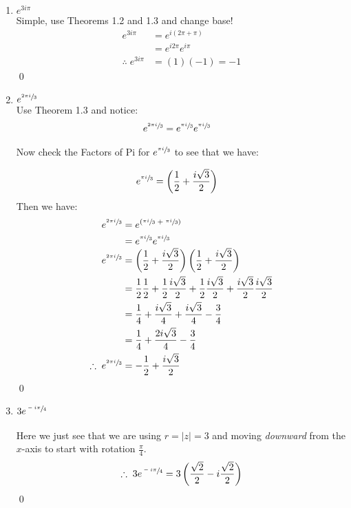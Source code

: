 \begin{enumerate}
\begin{enumerate}
		\item $e^{3i\pi}$ \\
		Simple, use Theorems 1.2 and 1.3 and change base!
		\begin{align*}
			e^{3i\pi} &= e^{i(2\pi + \pi)} \\
			&= e^{i2\pi}e^{i\pi} \\
			\therefore \; e^{3i\pi} &= (1)(-1) = -1
		\end{align*}
		\qed


		\item $e^{\sfrac{2\pi i}{3}}$ \\
		Use Theorem 1.3 and notice:
		\begin{align*}
			e^{\sfrac{2\pi i}{3}} &= e^{\sfrac{\pi i}{3}}e^{\sfrac{\pi i}{3}}
		\end{align*} 

		Now check the Factors of Pi for $e^{\sfrac{\pi i}{3}}$ to see that we have:

		\begin{align*}
			e^{\sfrac{\pi i}{3}} &= \left( \frac{1}{2} + \frac{i\sqrt{3}}{2} \right)
		\end{align*}
		Then we have:
		\begin{align*}
			e^{\sfrac{2\pi i}{3}} &= e^{(\sfrac{\pi i}{3} \; + \; \sfrac{\pi i}{3} )} \\
			&= e^{\sfrac{\pi i}{3}} e^{\sfrac{\pi i}{3}} \\
			e^{\sfrac{2\pi i}{3}} &= \left( \frac{1}{2} + \frac{i\sqrt{3}}{2} \right) \left( \frac{1}{2} + \frac{i\sqrt{3}}{2} \right) \\
			&= \frac{1}{2} \frac{1}{2} + \frac{1}{2} \frac{i \sqrt{3}}{2} + \frac{1}{2} \frac{i \sqrt{3}}{2} + \frac{i \sqrt{3}}{2} \frac{i \sqrt{3}}{2} \\
			&= \frac{1}{4} +\frac{i \sqrt{3}}{4} + \frac{i \sqrt{3}}{4} - \frac{3}{4} \\
			&= \frac{1}{4} + \frac{2i \sqrt{3}}{4} - \frac{3}{4} \\
			\therefore \; e^{\sfrac{2\pi i}{3}} &=  - \frac{1}{2} + \frac{i \sqrt{3}}{2} \\
		\end{align*}
		\qed
		

		\item $3e^{\sfrac{-i\pi}{4}}$ \\
		\\
		Here we just see that we are using $r = |z| = 3$ and moving \textit{downward} from the $x$-axis to start with rotation $\frac{\pi}{4}.$
		\begin{align*}
			\therefore \; 3e^{\sfrac{-i\pi}{4}} &= 3 \left( \frac{\sqrt{2}}{2} - i\frac{\sqrt{2}}{2} \right) \\
		\end{align*}
		\qed



\end{enumerate}
\end{enumerate}
